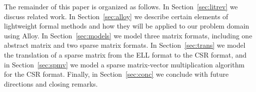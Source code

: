 The remainder of this paper is organized as follows.  In Section~\ref{sec:litrev} we discuss related work.  In Section~\ref{sec:alloy} we describe certain elements of lightweight formal methods and how they will be applied to our problem domain using Alloy.  In Section~\ref{sec:models} we model three matrix formats, including one abstract matrix and two sparse matrix formats.  In Section~\ref{sec:trans} we model the translation of a sparse matrix from the ELL format to the CSR format, and in Section~\ref{sec:spmv} we model a sparse matrix-vector multiplication algorithm for the CSR format.  Finally, in Section~\ref{sec:conc} we conclude with future directions and closing remarks.